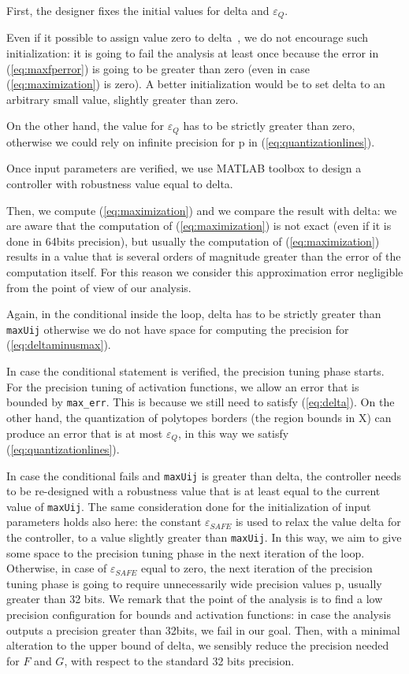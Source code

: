 \documentclass[sigconf]{acmart}
\newcommand{\statespace}{X}
\begin{document}
First, the designer fixes the initial values for delta and $\varepsilon_{Q}$.

Even if it possible to assign value zero to delta~\cite{imperialrmpc}, we do not encourage such initialization: it is going to fail the analysis at least once because the error in (\ref{eq:maxfperror}) is going to be greater than zero (even in case (\ref{eq:maximization}) is zero). A better initialization would be to set delta to an arbitrary small value, slightly greater than zero.

On the other hand, the value for $\varepsilon_{Q}$ has to be strictly greater than zero, otherwise we could rely on infinite precision for p in (\ref{eq:quantizationlines}).

Once input parameters are verified, we use MATLAB toolbox to design a controller with robustness value equal to delta. 

Then, we compute (\ref{eq:maximization}) and we compare the result with delta: we are aware that the computation of (\ref{eq:maximization}) is not exact (even if it is done in 64bits precision), but usually the computation of (\ref{eq:maximization}) results in a value that is several orders of magnitude greater than the error of the computation itself. For this reason we consider this approximation error negligible from the point of view of our analysis. 

Again, in the conditional inside the loop, delta has to be strictly greater than \texttt{maxUij} otherwise we do not have space for computing the precision for (\ref{eq:deltaminusmax}).

In case the conditional statement is verified,
the precision tuning phase starts.
For the precision tuning of activation functions, we allow an error that is bounded by \texttt{max\_err}. This is because we still need to satisfy (\ref{eq:delta}).
On the other hand, the quantization of polytopes borders (the region bounds in \statespace) can produce an error that is at most $\varepsilon_{Q}$, in this way we satisfy 
(\ref{eq:quantizationlines}).

In case the conditional fails and \texttt{maxUij} is greater than delta, the controller needs to be re-designed with a robustness value that is at least equal to the current value of \texttt{maxUij}. The same consideration done for the initialization of input parameters holds also here: the constant $\varepsilon_{SAFE}$ is used to relax the value delta for the controller, to a value slightly greater than \texttt{maxUij}. In this way, we aim to give some space to the precision tuning phase in the next iteration of the loop. Otherwise, in case of $\varepsilon_{SAFE}$ equal to zero, the next iteration of the precision tuning phase is going to require unnecessarily wide precision values p, usually greater than 32 bits. 
We remark that the point of the analysis is to find a low precision configuration for bounds and activation functions: in case the analysis outputs a precision greater than 32bits, we fail in our goal.
Then, with a minimal alteration to the upper bound of delta, we sensibly reduce the precision needed for $F$ and $G$, with respect to the standard 32 bits precision.
\end{document}
